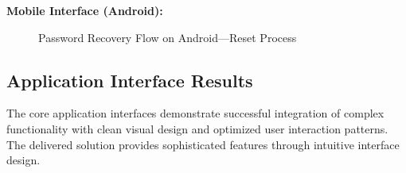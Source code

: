 \textbf{Mobile Interface (Android):}
\begin{figure}[!htbp]
    \centering
    \hspace{0.02\textwidth}
    \caption{Password Recovery Flow on Android---Reset Process}\label{fig:android_password_recovery}
\end{figure}

\subsection{Application Interface Results}\label{subsec:app_interface_results}

The core application interfaces demonstrate successful integration of complex functionality with clean visual design and optimized user interaction patterns. The delivered solution provides sophisticated features through intuitive interface design.

